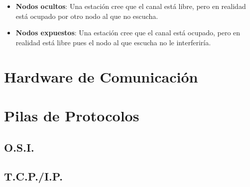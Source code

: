 \documentclass[a4paper]{article}
\begin{document}
	\begin{itemize}
		\item \textbf{Nodos ocultos}: Una estación cree que el canal está libre, pero en realidad está ocupado por otro nodo al que no escucha.
		
		\item \textbf{Nodos expuestos}: Una estación cree que el canal está ocupado, pero en realidad está libre pues el nodo al que escucha no le interferiría. 
	\end{itemize}
	
	\section{Hardware de Comunicación}
	
	\section{Pilas de Protocolos}
	\subsection{O.S.I.}
	\subsection{T.C.P./I.P.}
	
	
	
	
\end{document}
